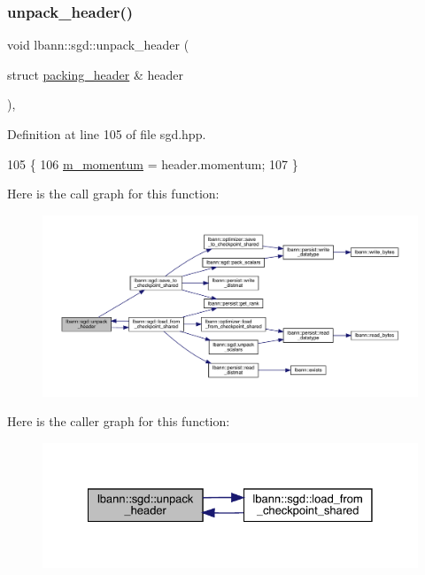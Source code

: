 \subsubsection{\texorpdfstring{unpack\+\_\+header()}{unpack\_header()}}
{\footnotesize\ttfamily void lbann\+::sgd\+::unpack\+\_\+header (\begin{DoxyParamCaption}\item[{struct \hyperlink{structlbann_1_1sgd_1_1packing__header}{packing\+\_\+header} \&}]{header }\end{DoxyParamCaption})\hspace{0.3cm}{\ttfamily [inline]}, {\ttfamily [private]}}



Definition at line 105 of file sgd.\+hpp.


\begin{DoxyCode}
105                                                    \{
106     \hyperlink{classlbann_1_1sgd_a2e56d66d350debcf0d2c3ad76c214074}{m\_momentum} = header.momentum;
107   \}
\end{DoxyCode}
Here is the call graph for this function\+:\nopagebreak
\begin{figure}[H]
\begin{center}
\leavevmode
\includegraphics[width=350pt]{classlbann_1_1sgd_a3afe5aa1f1861c390472ff6f53093386_cgraph}
\end{center}
\end{figure}
Here is the caller graph for this function\+:\nopagebreak
\begin{figure}[H]
\begin{center}
\leavevmode
\includegraphics[width=328pt]{classlbann_1_1sgd_a3afe5aa1f1861c390472ff6f53093386_icgraph}
\end{center}
\end{figure}
\mbox{\label{classlbann_1_1sgd_a2b4a91cbb155ed94a185db79fdbf6284}} 
